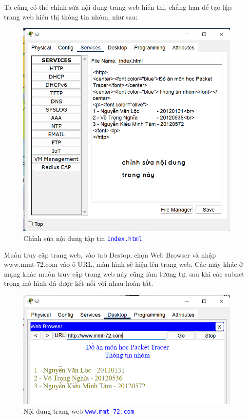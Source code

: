 \begin{enumerate}
\begin{enumerate}
Ta cũng có thể chỉnh sửa nội dung trang web hiển thị, chẳng hạn để tạo lập trang web hiển thị thông tin nhóm, như sau:

\begin{figure}[H]
\begin{center}
\includegraphics[scale=.7]{../figures/p2/web2}
\end{center}
\caption{Chỉnh sửa nội dung tập tin \texttt{\textcolor{blue}{index.html}}}
\end{figure}

Muốn truy cập trang web, vào tab Destop, chọn Web Browser và nhập www.mmt-72.com vào ô URL, màn hình sẽ hiện lên trang web. Các máy khác ở mạng khác muốn truy cập trang web này cũng làm tương tự, sau khi các subnet trong mô hình đã được kết nối với nhau hoàn tất.

\begin{figure}[H]
\begin{center}
\includegraphics[scale=.7]{../figures/p2/web3}
\end{center}
\caption{Nội dung trang web \texttt{\textcolor{blue}{www.mmt-72.com}}}
\end{figure}


\end{enumerate}
\end{enumerate}
